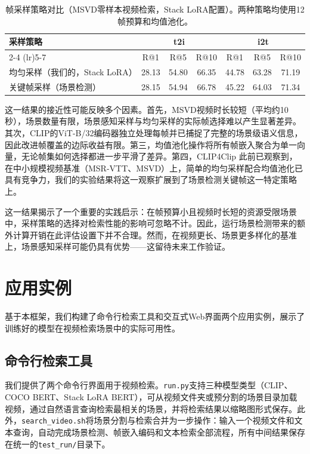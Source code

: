 \documentclass[10pt,a4paper]{ctexart}
\begin{document}
\begin{table}[htbp]
\centering
\caption{帧采样策略对比（MSVD零样本视频检索，Stack LoRA配置）。两种策略均使用12帧预算和均值池化。}
\label{tab:sampling}
\begin{tabular}{lcccccc}
\toprule
采样策略 & \multicolumn{3}{c}{t2i} & \multicolumn{3}{c}{i2t} \\
\cmidrule(lr){2-4} \cmidrule(lr){5-7}
 & R@1 & R@5 & R@10 & R@1 & R@5 & R@10 \\
\midrule
均匀采样（我们的，Stack LoRA） & 28.13 & 54.80 & 66.35 & 44.78 & 63.28 & 71.19 \\
关键帧采样（场景检测） & 28.15 & 54.94 & 66.78 & 45.22 & 64.03 & 71.34 \\
\bottomrule
\end{tabular}
\end{table}

这一结果的接近性可能反映多个因素。首先，MSVD视频时长较短（平均约10秒），场景数量有限，场景感知采样与均匀采样的实际帧选择难以产生显著差异。其次，CLIP的ViT-B/32编码器独立处理每帧并已捕捉了完整的场景级语义信息，因此改进帧覆盖的边际收益有限。第三，均值池化操作将所有帧嵌入聚合为单一向量，无论帧集如何选择都进一步平滑了差异。第四，CLIP4Clip \citep{luo2022clip4clip}此前已观察到，在中小规模视频基准（MSR-VTT、MSVD）上，简单的均匀采样配合均值池化已具有竞争力，我们的实验结果将这一观察扩展到了场景检测关键帧这一特定策略上。

这一结果揭示了一个重要的实践启示：在帧预算小且视频时长短的资源受限场景中，采样策略的选择对检索性能的影响可忽略不计。因此，运行场景检测带来的额外计算开销在此评估设置下并不合理。然而，在视频更长、场景更多样化的基准上，场景感知采样可能仍具有优势——这留待未来工作验证。

\section{应用实例}

基于本框架，我们构建了命令行检索工具和交互式Web界面两个应用实例，展示了训练好的模型在视频检索场景中的实际可用性。

\subsection{命令行检索工具}

我们提供了两个命令行界面用于视频检索。\texttt{run.py}支持三种模型类型（CLIP、COCO BERT、Stack LoRA BERT），可从视频文件夹或预分割的场景目录加载视频，通过自然语言查询检索最相关的场景，并将检索结果以缩略图形式保存。此外，\texttt{search\_video.sh}将场景分割与检索合并为一步操作：输入一个视频文件和文本查询，自动完成场景检测、帧嵌入编码和文本检索全部流程，所有中间结果保存在统一的\texttt{test\_run/}目录下。
\end{document}

